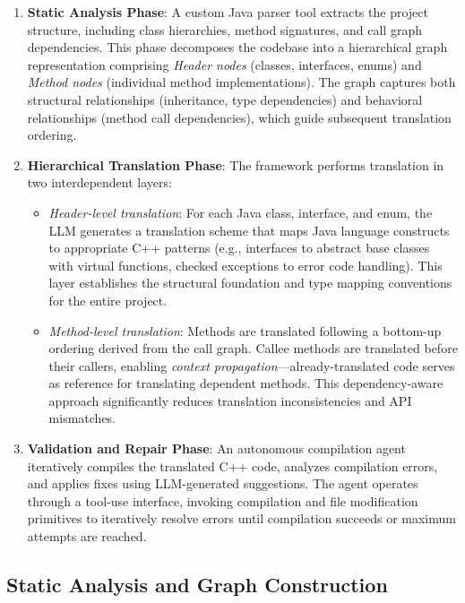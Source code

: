 \begin{enumerate}
\item \textbf{Static Analysis Phase}: A custom Java parser tool extracts the project structure, including class hierarchies, method signatures, and call graph dependencies. This phase decomposes the codebase into a hierarchical graph representation comprising \emph{Header nodes} (classes, interfaces, enums) and \emph{Method nodes} (individual method implementations). The graph captures both structural relationships (inheritance, type dependencies) and behavioral relationships (method call dependencies), which guide subsequent translation ordering.

\item \textbf{Hierarchical Translation Phase}: The framework performs translation in two interdependent layers:
\begin{itemize}
\item \textit{Header-level translation}: For each Java class, interface, and enum, the LLM generates a translation scheme that maps Java language constructs to appropriate C++ patterns (e.g., interfaces to abstract base classes with virtual functions, checked exceptions to error code handling). This layer establishes the structural foundation and type mapping conventions for the entire project.
\item \textit{Method-level translation}: Methods are translated following a bottom-up ordering derived from the call graph. Callee methods are translated before their callers, enabling \emph{context propagation}---already-translated code serves as reference for translating dependent methods. This dependency-aware approach significantly reduces translation inconsistencies and API mismatches.
\end{itemize}

\item \textbf{Validation and Repair Phase}: An autonomous compilation agent iteratively compiles the translated C++ code, analyzes compilation errors, and applies fixes using LLM-generated suggestions. The agent operates through a tool-use interface, invoking compilation and file modification primitives to iteratively resolve errors until compilation succeeds or maximum attempts are reached.
\end{enumerate}

\subsection{Static Analysis and Graph Construction}

